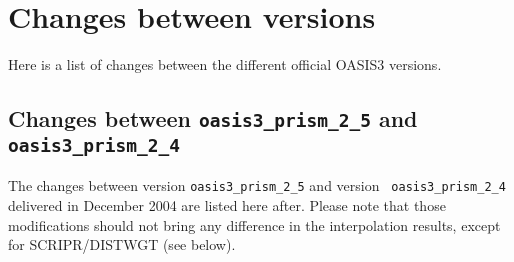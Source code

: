 \newpage

\chapter{Changes between versions}
\label{sec_changes}

Here is a list of changes between the different official OASIS3
versions.
\section{Changes between {\tt oasis3\_prism\_2\_5} and {\tt
oasis3\_prism\_2\_4}}

The changes between version {\tt oasis3\_prism\_2\_5} and version {\tt
  oasis3\_prism\_2\_4} delivered in December 2004 are listed here
after. Please note that those modifications should not bring any
difference in the interpolation results, except for SCRIPR/DISTWGT
(see below).

